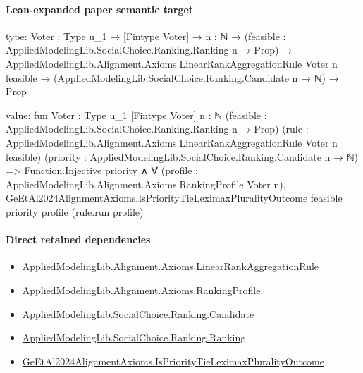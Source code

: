 \documentclass[10pt]{article}
\begin{document}
\paragraph{Lean-expanded paper semantic target}
\begin{ReviewVerbatim}
type:
{Voter : Type u_1} →
  [Fintype Voter] →
    {n : ℕ} →
      (feasible : AppliedModelingLib.SocialChoice.Ranking.Ranking n → Prop) →
        AppliedModelingLib.Alignment.Axioms.LinearRankAggregationRule Voter n feasible →
          (AppliedModelingLib.SocialChoice.Ranking.Candidate n → ℕ) → Prop

value:
fun {Voter : Type u_1} [Fintype Voter] {n : ℕ} (feasible : AppliedModelingLib.SocialChoice.Ranking.Ranking n → Prop)
    (rule : AppliedModelingLib.Alignment.Axioms.LinearRankAggregationRule Voter n feasible)
    (priority : AppliedModelingLib.SocialChoice.Ranking.Candidate n → ℕ) =>
  Function.Injective priority ∧
    ∀ (profile : AppliedModelingLib.Alignment.Axioms.RankingProfile Voter n),
      GeEtAl2024AlignmentAxioms.IsPriorityTieLeximaxPluralityOutcome feasible priority profile (rule.run profile)
\end{ReviewVerbatim}

\paragraph{Direct retained dependencies}
\begin{itemize}\raggedright
\item \hyperlink{library-prerequisite-43447e121a1884f9}{Applied\allowbreak{}Modeling\allowbreak{}Lib.\allowbreak{}Alignment.\allowbreak{}Axioms.\allowbreak{}Linear\allowbreak{}Rank\allowbreak{}Aggregation\allowbreak{}Rule}
\item \hyperlink{library-prerequisite-9bded048a60dfe0a}{Applied\allowbreak{}Modeling\allowbreak{}Lib.\allowbreak{}Alignment.\allowbreak{}Axioms.\allowbreak{}Ranking\allowbreak{}Profile}
\item \hyperlink{library-prerequisite-8c0e6c25845ae78a}{Applied\allowbreak{}Modeling\allowbreak{}Lib.\allowbreak{}Social\allowbreak{}Choice.\allowbreak{}Ranking.\allowbreak{}Candidate}
\item \hyperlink{library-prerequisite-5cde54446d1ae021}{Applied\allowbreak{}Modeling\allowbreak{}Lib.\allowbreak{}Social\allowbreak{}Choice.\allowbreak{}Ranking.\allowbreak{}Ranking}
\item \hyperlink{governing-declaration-a0b615d1878d6c42}{Ge\allowbreak{}Et\allowbreak{}Al2024\allowbreak{}Alignment\allowbreak{}Axioms.\allowbreak{}Is\allowbreak{}Priority\allowbreak{}Tie\allowbreak{}Leximax\allowbreak{}Plurality\allowbreak{}Outcome}
\end{itemize}
\end{document}
